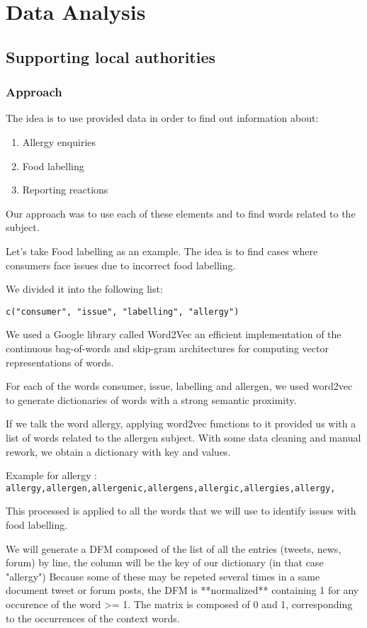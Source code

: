 \section{Data Analysis}
\label{sec:data_analysis}

\subsection{Supporting local authorities}
\label{subsec:supp_local_autho}

\subsubsection{Approach}

The idea is to use provided data in order to find out information about:
\begin{enumerate}
  \item Allergy enquiries
  \item Food labelling
  \item Reporting reactions
\end{enumerate}

Our approach was to use each of these elements and to find words related to the subject.

Let's take Food labelling as an example. The idea is to find cases where consumers face issues due to incorrect food labelling.

We divided it into the following list:

{\tt c("consumer", "issue", "labelling", "allergy")}

We used a Google library called Word2Vec an efficient implementation of the continuous bag-of-words and skip-gram architectures for computing vector representations of words.

For each of the words consumer, issue, labelling and allergen, we used word2vec to generate dictionaries of words with a strong semantic proximity.

If we talk the word allergy, applying word2vec functions to it provided us with a list of words related to the allergen subject.
With some data cleaning and manual rework, we obtain a dictionary with key and values.

Example for allergy : {\tt allergy,allergen,allergenic,allergens,allergic,allergies,allergy,}

This processed is applied to all the words that we will use to identify issues with food labelling.

We will generate a DFM composed of the list of all the entries (tweets, news, forum) by line, the column will be the key of our dictionary (in that case "allergy")
Because some of these may be repeted several times in a same document tweet or forum posts, the DFM is **normalized** containing 1 for  any occurence of the word >= 1. The matrix is composed of 0 and 1, corresponding to the occurrences of the context words.

